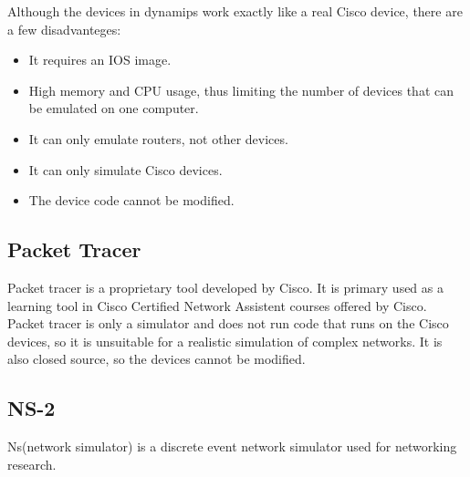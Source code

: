 Although the devices in dynamips work exactly like a real Cisco device, there are a few disadvanteges:
\begin{itemize}
  \item It requires an IOS image.
  \item High memory and CPU usage, thus limiting the number of devices that can be emulated on one computer.
  \item It can only emulate routers, not other devices.
  \item It can only simulate Cisco devices.
  \item The device code cannot be modified.
\end{itemize}

\subsection{Packet Tracer}

Packet tracer is a proprietary tool developed by Cisco. It is primary used as a learning tool
in Cisco Certified Network Assistent courses offered by Cisco.
Packet tracer is only a simulator and does not run code that runs on the Cisco devices, so
it is unsuitable for a realistic simulation of complex networks. It is also closed source, so
the devices cannot be modified.


\subsection{NS-2}
Ns(network simulator) is a discrete event network simulator used for networking research.
